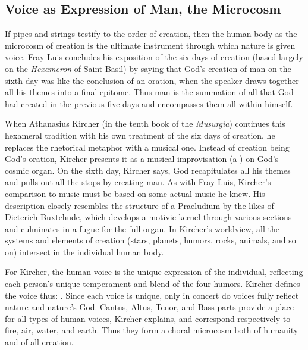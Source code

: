 \subsection{Voice as Expression of Man, the Microcosm}

If pipes and strings testify to the order of creation, then the human body as
the microcosm of creation is the ultimate instrument through which nature is
given voice.
Fray Luis concludes his exposition of the six days of creation (based largely
on the \emph{Hexameron} of Saint Basil) by saying that God's creation of man on
the sixth day was like the conclusion of an oration, when the speaker draws
together all his themes into a final epitome.
Thus man is the summation of all that God had created in the previous five days
and encompasses them all within himself.%
    \Autocite[243]{LuisdeGranada:Simbolo}

When Athanasius Kircher (in the tenth book of the \emph{Musurgia}) continues
this hexameral tradition with his own treatment of the six days of creation, he
replaces the rhetorical metaphor with a musical one.
Instead of creation being God's oration, Kircher presents it as a musical
improvisation (a ) on God's cosmic organ.%
    \Autocite[, 366--367]{Kircher:Musurgia}
On the sixth day, Kircher says, God recapitulates all his themes and pulls out
all the stops by creating man.
As with Fray Luis, Kircher's comparison to music must be based on some actual
music he knew. 
His description closely resembles the structure of a Praeludium by the
likes of Dieterich Buxtehude, which develops a motivic kernel through various
sections and culminates in a fugue for the full organ.
In Kircher's worldview, all the systems and elements of creation (stars,
planets, humors, rocks, animals, and so on) intersect in the individual human
body.%
    \Autocite[, 402]{Kircher:Musurgia}

For Kircher, the human voice is the unique expression of the individual,
reflecting each person's unique temperament and blend of the four humors.%
    \Autocite[, 23--24]{Kircher:Musurgia}
Kircher defines the voice thus: .%
    \Autocite[, 20]{Kircher:Musurgia}
Since each voice is unique, only in concert do voices fully reflect nature and
nature's God.
Cantus, Altus, Tenor, and Bass parts provide a place for all types of human
voices, Kircher explains, and correspond respectively to fire, air, water, and
earth.
Thus they form a choral microcosm both of humanity and of all creation.%
    \Autocite[, 217--219]{Kircher:Musurgia}

